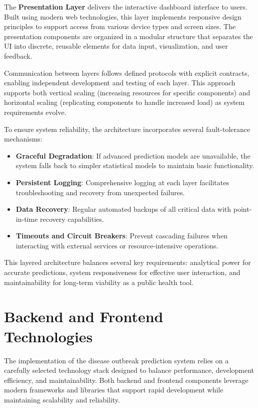 \documentclass[12pt,a4paper]{report}
\begin{document}
The \textbf{Presentation Layer} delivers the interactive dashboard interface to users. Built using modern web technologies, this layer implements responsive design principles to support access from various device types and screen sizes. The presentation components are organized in a modular structure that separates the UI into discrete, reusable elements for data input, visualization, and user feedback.

Communication between layers follows defined protocols with explicit contracts, enabling independent development and testing of each layer. This approach supports both vertical scaling (increasing resources for specific components) and horizontal scaling (replicating components to handle increased load) as system requirements evolve.

To ensure system reliability, the architecture incorporates several fault-tolerance mechanisms:

\begin{itemize}
    \item \textbf{Graceful Degradation}: If advanced prediction models are unavailable, the system falls back to simpler statistical models to maintain basic functionality.
    \item \textbf{Persistent Logging}: Comprehensive logging at each layer facilitates troubleshooting and recovery from unexpected failures.
    \item \textbf{Data Recovery}: Regular automated backups of all critical data with point-in-time recovery capabilities.
    \item \textbf{Timeouts and Circuit Breakers}: Prevent cascading failures when interacting with external services or resource-intensive operations.
\end{itemize}

This layered architecture balances several key requirements: analytical power for accurate predictions, system responsiveness for effective user interaction, and maintainability for long-term viability as a public health tool.

\section{Backend and Frontend Technologies}
The implementation of the disease outbreak prediction system relies on a carefully selected technology stack designed to balance performance, development efficiency, and maintainability. Both backend and frontend components leverage modern frameworks and libraries that support rapid development while maintaining scalability and reliability.
\end{document}
